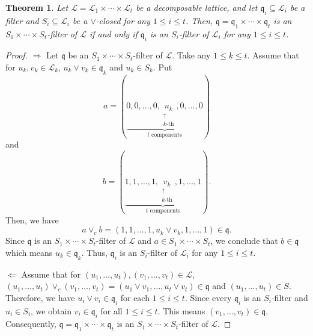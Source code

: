 \documentclass[preprint,review,10pt]{amsart}
\newtheorem{theorem}{Theorem}[section]
\theoremstyle{definition}
\theoremstyle{remark}
\numberwithin{equation}{section}
\begin{document}
\begin{theorem} \label{car}
Let $\mathscr{L}=\mathscr{L}_1 \times \cdots \times \mathscr{L}_t$ be a decomposable lattice, and let $\mathfrak{q}_i \subseteq \mathscr{L}_i$ be a filter and $S_i \subseteq \mathscr{L}_i$ be a $\vee$-closed for any $1 \le i \le t$. Then, $\mathfrak{q}= \mathfrak{q}_1 \times \cdots \times  \mathfrak{q}_t$ is an $S_1 \times \cdots \times S_t$-filter of $\mathscr{L}$ if and only if $\mathfrak{q}_i$ is an $S_i$-filter of $\mathscr{L}_i$ for any $1 \le i \le t$.
\end{theorem}
\begin{proof}
$\Longrightarrow$ Let $\mathfrak{q}$ be an $S_1 \times \cdots \times S_t$-filter of $\mathscr{L}$. Take any $1 \le k \le t$. Assume that for $u_k,v_k \in \mathscr{L}_k$, $u_k \vee v_k \in \mathfrak{q}_k$  and $u_k \in S_k$. Put 
\[a = ( \underbrace{0, 0, \dots, 0, \underset{\substack{\uparrow \\ k\text{-th}}}{u_k}, 0, \dots, 0}_{t \text{ components}} )\]
and
\[b = ( \underbrace{1, 1, \dots, 1, \underset{\substack{\uparrow \\ k\text{-th}}}{v_k}, 1, \dots, 1}_{t \text{ components}} ).\]
Then, we have 
\[a \vee_c b=(1, 1, \dots, 1,  u_k \vee v_k , 1, \dots, 1) \in \mathfrak{q}.\]
Since $\mathfrak{q}$ is an $S_1 \times \cdots \times S_t$-filter of $\mathscr{L}$ and $a \in S_1 \times \cdots \times S_t$, we conclude that $b \in \mathfrak{q}$ which means $u_k \in \mathfrak{q}_k$. Thus, $\mathfrak{q}_i$ is an $S_i$-filter of $\mathscr{L}_i$ for any $1 \le i \le t$.

$\Longleftarrow$ Assume that for $(u_1,\ldots,u_t),(v_1,\ldots,v_t) \in  \mathscr{L}$, $(u_1,\ldots,u_t) \vee _c(v_1,\ldots,v_t)=(u_1 \vee v_1,\ldots,u_t \vee v_t) \in \mathfrak{q}$ and $(u_1,\ldots,u_t) \in S$. Therefore, we have $u_i \vee v_i \in \mathfrak{q}_i$ for each $1 \leq i \leq t$. Since every $ \mathfrak{q}_i$ is an $S_i$-filter and $u_i \in S_i$, we obtain $v_i \in  \mathfrak{q}_i$ for all $1 \leq i \leq t$. This means $(v_1,\ldots,v_t) \in \mathfrak{q}$. Consequently, $\mathfrak{q}= \mathfrak{q}_1 \times \cdots \times  \mathfrak{q}_t$ is an $S_1 \times \cdots \times S_t$-filter of $\mathscr{L}$.
\end{proof}
\end{document}
